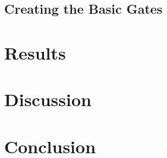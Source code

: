 \documentclass[reprint, amsmath, amssymb, aps, letterpaper]{revtex4-2}
\begin{document}
\subsection{Creating the Basic Gates}



\section{Results}

\section{Discussion}

\section{Conclusion}
\end{document}
